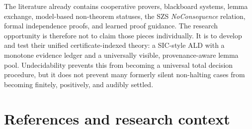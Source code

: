 \documentclass[11pt]{article}
\theoremstyle{definition}
\theoremstyle{remark}
\begin{document}
The literature already contains cooperative provers, blackboard systems, lemma exchange, model-based non-theorem statuses, the SZS \emph{NoConsequence} relation, formal independence proofs, and learned proof guidance. The research opportunity is therefore not to claim those pieces individually. It is to develop and test their unified certificate-indexed theory: a SIC-style ALD with a monotone evidence ledger and a universally visible, provenance-aware lemma pool. Undecidability prevents this from becoming a universal total decision procedure, but it does not prevent many formerly silent non-halting cases from becoming finitely, positively, and audibly settled.

\clearpage
\section*{References and research context}
\end{document}
